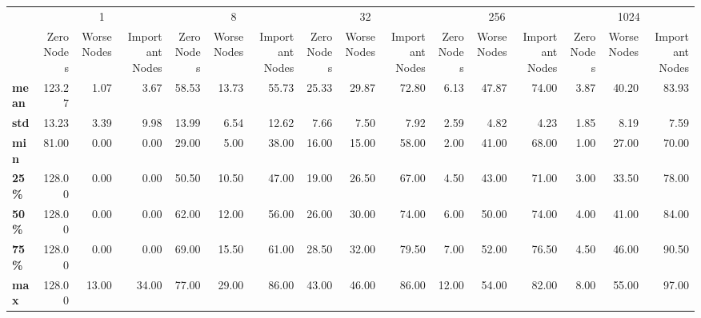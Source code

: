 \begin{tabular}{lrrrrrrrrrrrrrrr}
\toprule
{} & \multicolumn{3}{c}{1} & \multicolumn{3}{c}{8} & \multicolumn{3}{c}{32} & \multicolumn{3}{c}{256} & \multicolumn{3}{c}{1024} \\
{} & Zero Nodes & Worse Nodes & Important Nodes & Zero Nodes & Worse Nodes & Important Nodes & Zero Nodes & Worse Nodes & Important Nodes & Zero Nodes & Worse Nodes & Important Nodes & Zero Nodes & Worse Nodes & Important Nodes \\
\midrule
\textbf{mean} &     123.27 &        1.07 &            3.67 &      58.53 &       13.73 &           55.73 &      25.33 &       29.87 &           72.80 &       6.13 &       47.87 &           74.00 &       3.87 &       40.20 &           83.93 \\
\textbf{std } &      13.23 &        3.39 &            9.98 &      13.99 &        6.54 &           12.62 &       7.66 &        7.50 &            7.92 &       2.59 &        4.82 &            4.23 &       1.85 &        8.19 &            7.59 \\
\textbf{min } &      81.00 &        0.00 &            0.00 &      29.00 &        5.00 &           38.00 &      16.00 &       15.00 &           58.00 &       2.00 &       41.00 &           68.00 &       1.00 &       27.00 &           70.00 \\
\textbf{25\% } &     128.00 &        0.00 &            0.00 &      50.50 &       10.50 &           47.00 &      19.00 &       26.50 &           67.00 &       4.50 &       43.00 &           71.00 &       3.00 &       33.50 &           78.00 \\
\textbf{50\% } &     128.00 &        0.00 &            0.00 &      62.00 &       12.00 &           56.00 &      26.00 &       30.00 &           74.00 &       6.00 &       50.00 &           74.00 &       4.00 &       41.00 &           84.00 \\
\textbf{75\% } &     128.00 &        0.00 &            0.00 &      69.00 &       15.50 &           61.00 &      28.50 &       32.00 &           79.50 &       7.00 &       52.00 &           76.50 &       4.50 &       46.00 &           90.50 \\
\textbf{max } &     128.00 &       13.00 &           34.00 &      77.00 &       29.00 &           86.00 &      43.00 &       46.00 &           86.00 &      12.00 &       54.00 &           82.00 &       8.00 &       55.00 &           97.00 \\
\bottomrule
\end{tabular}
